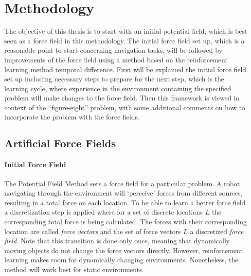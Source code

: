 \documentclass[11pt]{article}
\begin{document}



\section{Methodology}
\label{sec:method}


The objective of this thesis is to start with an initial potential field, which is best seen as a force field in this methodology. The initial force field set up, which is a reasonable point to start concerning navigation tasks, will be followed by improvements of the force field using a method based on the reinforcement learning method temporal difference. First will be explained the initial force field set up including necessary steps to prepare for the next step, which is the learning cycle, where experience in the environment containing the specified problem will make changes to the force field. Then this framework is viewed in context of the ``figure-eight'' problem, with some additional comments on how to incorporate the problem with the force fields.

\subsection{Artificial Force Fields}
\paragraph{Initial Force Field}
The Potential Field Method sets a force field for a particular problem. A robot navigating through the environment will `perceive' forces from different sources, resulting in a total force on each location. To be able to learn a better force field a discretization step is applied where for a set of discrete locations $L$ the corresponding total force is being calculated. The forces with their corresponding location are called \emph{force vectors} and the set of force vectors $L$ a discretized \emph{force field}. Note that this transition is done only once, meaning that dynamically moving objects do not change the force vectors directly. However, reinforcement learning makes room for dynamically changing environments. Nonetheless, the method will work best for static environments.
\end{document}
